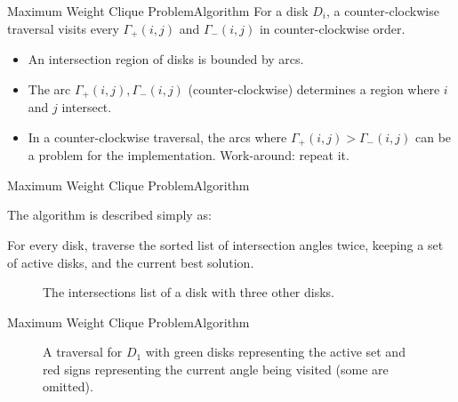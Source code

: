\documentclass{beamer}
\begin{document}
\begin{frame}{Maximum Weight Clique Problem}{Algorithm}
	For a disk $D_i$, a counter-clockwise traversal visits every $\Gamma_+(i,j)$ and $\Gamma_-(i,j)$ in counter-clockwise order.
	
	\begin{itemize}
		\item An intersection region of disks is bounded by arcs.
		
		\item The arc $\Gamma_+(i,j),\Gamma_-(i,j)$ (counter-clockwise) determines a region where $i$ and $j$ intersect.
		
		\item In a counter-clockwise traversal, the arcs where $\Gamma_+(i,j) > \Gamma_-(i,j)$ can be a problem for the implementation. Work-around: repeat it.
	\end{itemize}
\end{frame}

\begin{frame}{Maximum Weight Clique Problem}{Algorithm}
	
	The algorithm is described simply as:
	
	For every disk, traverse the sorted list of intersection angles twice, keeping a set of active disks, and the current best solution.
	
\begin{figure}[H]
	\centering
	
	\caption{The intersections list of a disk with three other disks.}
	
	\label{fig:array_disks}
\end{figure}
\end{frame}

\begin{frame}{Maximum Weight Clique Problem}{Algorithm}
\begin{figure}
	
	\caption{A traversal for $D_1$ with green disks representing the active set and red signs representing the current angle being visited (some are omitted).}
	
\end{figure}
\end{frame}
\end{document}
